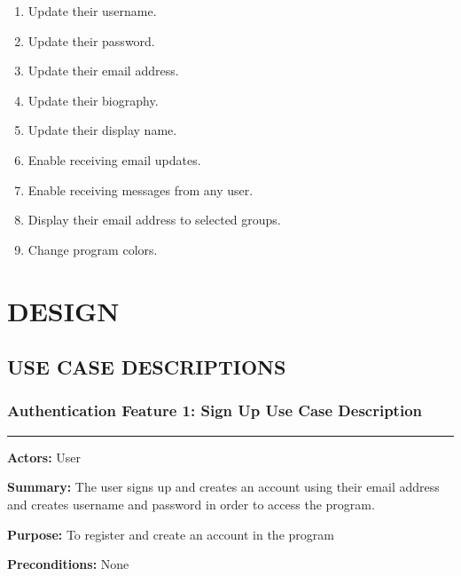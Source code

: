 \documentclass[twoside,letterpaper]{article}
\begin{document}
	\begin{enumerate}
		\item Update their username.
		\item Update their password.
		\item Update their email address.
		\item Update their biography.
		\item Update their display name.
		\item Enable receiving email updates.
		\item Enable receiving messages from any user.
		\item Display their email address to selected groups.
		\item Change program colors.
	\end{enumerate}
	
	\bigskip


\section[DESIGN]{\rmfamily\bfseries DESIGN}



\subsection[USE CASE DESCRIPTIONS]{\rmfamily\bfseries USE CASE DESCRIPTIONS}


	\subsubsection[Authentication Feature 1: Sign Up Use Case Description]{\rmfamily\bfseries\color{black}
	Authentication Feature 1: Sign Up Use Case Description}
	\hypertarget{RefHeading22059017292}{}
	\label{a:uc1}
	
	\vspace{2pt}
	\hrule
	\vspace{8pt}
	\textbf{Actors:} User \newline
	
	\noindent\textbf{Summary:} The user signs up and creates an account using their email address and creates username and password in order to access the program. \newline
	
	\noindent\textbf{Purpose:} To register and create an account in the program \newline
	
	\noindent\textbf{Preconditions:} None \newline
	
\end{document}
